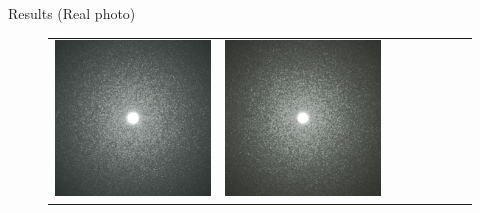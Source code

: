 \documentclass[final]{beamer}
\newlength{\twocolwid}
\newlength{\resultwidth}
\begin{document}
\begin{frame}[t]
\begin{columns}[t]
\begin{column}{\twocolwid}
\begin{block}{Results (Real photo)}
\begin{figure}[t]
\begin{tabular}{ccrclccc}
            		\includegraphics[width=\resultwidth]{real/flake/good2.jpg} &
            		\includegraphics[width=\resultwidth]{real/flake/good3.jpg} &

\end{tabular}
\end{figure}
\end{block}
\end{column}
\end{columns}
\end{frame}
\end{document}
